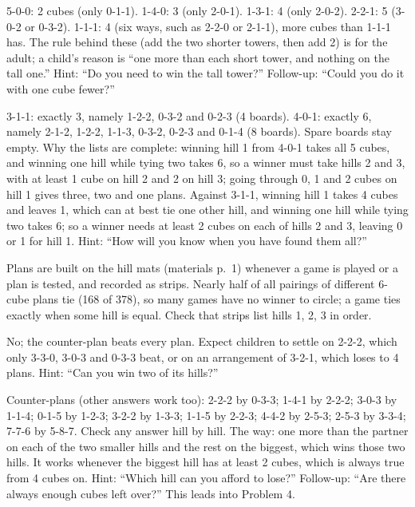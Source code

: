 5-0-0: 2 cubes (only 0-1-1). 1-4-0: 3 (only 2-0-1). 1-3-1: 4 (only 2-0-2). 2-2-1: 5 (3-0-2 or 0-3-2). 1-1-1: 4 (six ways, such as 2-2-0 or 2-1-1), more cubes than 1-1-1 has. The rule behind these (add the two shorter towers, then add 2) is for the adult; a child's reason is ``one more than each short tower, and nothing on the tall one.'' Hint: ``Do you need to win the tall tower?'' Follow-up: ``Could you do it with one cube fewer?''

3-1-1: exactly 3, namely 1-2-2, 0-3-2 and 0-2-3 (4 boards). 4-0-1: exactly 6, namely 2-1-2, 1-2-2, 1-1-3, 0-3-2, 0-2-3 and 0-1-4 (8 boards). Spare boards stay empty. Why the lists are complete: winning hill 1 from 4-0-1 takes all 5 cubes, and winning one hill while tying two takes 6, so a winner must take hills 2 and 3, with at least 1 cube on hill 2 and 2 on hill 3; going through 0, 1 and 2 cubes on hill 1 gives three, two and one plans. Against 3-1-1, winning hill 1 takes 4 cubes and leaves 1, which can at best tie one other hill, and winning one hill while tying two takes 6; so a winner needs at least 2 cubes on each of hills 2 and 3, leaving 0 or 1 for hill 1. Hint: ``How will you know when you have found them all?''

Plans are built on the hill mats (materials p.~1) whenever a game is played or a plan is tested, and recorded as strips.
Nearly half of all pairings of different 6-cube plans tie (168 of 378), so many games have no winner to circle; a game ties exactly when some hill is equal. Check that strips list hills 1, 2, 3 in order.

No; the counter-plan beats every plan. Expect children to settle on 2-2-2, which only 3-3-0, 3-0-3 and 0-3-3 beat, or on an arrangement of 3-2-1, which loses to 4 plans. Hint: ``Can you win two of its hills?''

Counter-plans (other answers work too): 2-2-2 by 0-3-3; 1-4-1 by 2-2-2; 3-0-3 by 1-1-4; 0-1-5 by 1-2-3; 3-2-2 by 1-3-3; 1-1-5 by 2-2-3; 4-4-2 by 2-5-3; 2-5-3 by 3-3-4; 7-7-6 by 5-8-7. Check any answer hill by hill. The way: one more than the partner on each of the two smaller hills and the rest on the biggest, which wins those two hills. It works whenever the biggest hill has at least 2 cubes, which is always true from 4 cubes on. Hint: ``Which hill can you afford to lose?'' Follow-up: ``Are there always enough cubes left over?'' This leads into Problem 4.

